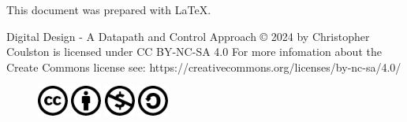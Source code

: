 This document was prepared with \LaTeX.
\vspace{2cm}

Digital Design - A Datapath and Control Approach © 2024 by Christopher Coulston is licensed under CC BY-NC-SA 4.0
For more infomation about the Create Commons license see: https://creativecommons.org/licenses/by-nc-sa/4.0/

\begin{figure}[h]
    \includegraphics[width=1cm]{./Fig/cc-logo.pdf}
    \includegraphics[width=1cm]{./Fig/cc-by.pdf}
    \includegraphics[width=1cm]{./Fig/cc-nc.pdf}
    \includegraphics[width=1cm]{./Fig/cc-sa.pdf}
\end{figure}

